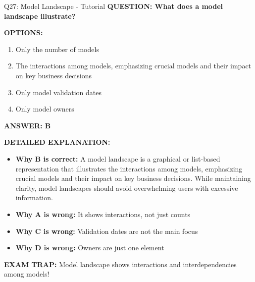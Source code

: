 \documentclass[8pt]{beamer}
\begin{document}
	\begin{frame}{Q27: Model Landscape - Tutorial}
		\fontsize{6.5}{7.5}\selectfont
		\textbf{QUESTION: What does a model landscape illustrate?}
		
		\vspace{0.1cm}
		\textbf{OPTIONS:}
		\begin{enumerate}
			\item Only the number of models
			\item The interactions among models, emphasizing crucial models and their impact on key business decisions
			\item Only model validation dates
			\item Only model owners
		\end{enumerate}
		
		\vspace{0.1cm}
		\textcolor{myblue}{\textbf{ANSWER: B}}
		
		\vspace{0.1cm}
		\textbf{DETAILED EXPLANATION:}
		\begin{itemize}
			\item \textbf{Why B is correct:} A model landscape is a graphical or list-based representation that illustrates the interactions among models, emphasizing crucial models and their impact on key business decisions. While maintaining clarity, model landscapes should avoid overwhelming users with excessive information.
			\item \textbf{Why A is wrong:} It shows interactions, not just counts
			\item \textbf{Why C is wrong:} Validation dates are not the main focus
			\item \textbf{Why D is wrong:} Owners are just one element
		\end{itemize}
		
		\textcolor{myred}{\textbf{EXAM TRAP:}} Model landscape shows \textcolor{myblue}{interactions and interdependencies} among models!
	\end{frame}
	
\end{document}
